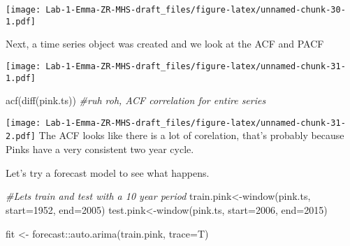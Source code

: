 \documentclass[
]{article}
\newenvironment{Shaded}{\begin{snugshade}}{\end{snugshade}}
\newcommand{\AttributeTok}[1]{\textcolor[rgb]{0.77,0.63,0.00}{#1}}
\newcommand{\CommentTok}[1]{\textcolor[rgb]{0.56,0.35,0.01}{\textit{#1}}}
\newcommand{\DecValTok}[1]{\textcolor[rgb]{0.00,0.00,0.81}{#1}}
\newcommand{\FunctionTok}[1]{\textcolor[rgb]{0.00,0.00,0.00}{#1}}
\newcommand{\NormalTok}[1]{#1}
\newcommand{\OtherTok}[1]{\textcolor[rgb]{0.56,0.35,0.01}{#1}}
\newcommand{\SpecialCharTok}[1]{\textcolor[rgb]{0.00,0.00,0.00}{#1}}
\begin{document}
\texttt{[image: Lab-1-Emma-ZR-MHS-draft\_files/figure-latex/unnamed-chunk-30-1.pdf]}

Next, a time series object was created and we look at the ACF and PACF

\begin{Shaded}
\end{Shaded}

\texttt{[image: Lab-1-Emma-ZR-MHS-draft\_files/figure-latex/unnamed-chunk-31-1.pdf]}

\begin{Shaded}
\begin{Highlighting}[]
\FunctionTok{acf}\NormalTok{(}\FunctionTok{diff}\NormalTok{(pink.ts)) }\CommentTok{\#ruh roh, ACF correlation for entire series }
\end{Highlighting}
\end{Shaded}

\texttt{[image: Lab-1-Emma-ZR-MHS-draft\_files/figure-latex/unnamed-chunk-31-2.pdf]}
The ACF looks like there is a lot of corelation, that's probably because
Pinks have a very consistent two year cycle.

Let's try a forecast model to see what happens.

\begin{Shaded}
\begin{Highlighting}[]
\CommentTok{\#Let\textquotesingle{}s train and test with a 10 year period}
\NormalTok{train.pink}\OtherTok{\textless{}{-}}\FunctionTok{window}\NormalTok{(pink.ts, }\AttributeTok{start=}\DecValTok{1952}\NormalTok{, }\AttributeTok{end=}\DecValTok{2005}\NormalTok{)}
\NormalTok{test.pink}\OtherTok{\textless{}{-}}\FunctionTok{window}\NormalTok{(pink.ts, }\AttributeTok{start=}\DecValTok{2006}\NormalTok{, }\AttributeTok{end=}\DecValTok{2015}\NormalTok{)}

\NormalTok{fit }\OtherTok{\textless{}{-}}\NormalTok{ forecast}\SpecialCharTok{::}\FunctionTok{auto.arima}\NormalTok{(train.pink, }\AttributeTok{trace=}\NormalTok{T)}
\end{Highlighting}
\end{Shaded}
\end{document}
